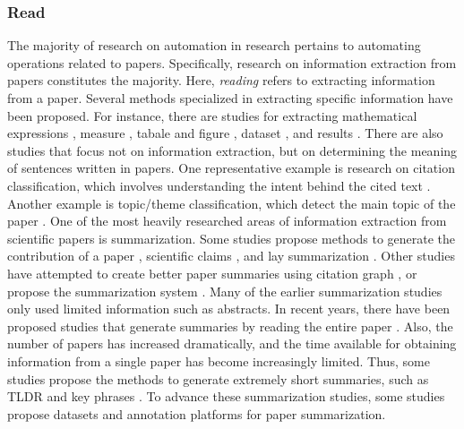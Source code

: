 \documentclass{article}
\begin{document}
\subsubsection{Read}
The majority of research on automation in research pertains to automating operations related to papers. Specifically, research on information extraction from papers constitutes the majority. Here, \textit{reading} refers to extracting information from a paper.
Several methods specialized in extracting specific information have been proposed. For instance, there are studies for extracting mathematical expressions \cite{greiner2020math,madisetty2021neural}, measure \cite{harper2021semeval,kohler2021s}, tabale and figure \cite{shen2022vila,hashmi2021current,zhuang2022resel,yamamoto2021visual}, dataset \cite{hou2019identification,kumar2021dataquest,prasad2019dataset}, and results \cite{kardas2020axcell}.
There are also studies that focus not on information extraction, but on determining the meaning of sentences written in papers. One representative example is research on citation classification, which involves understanding the intent behind the cited text \cite{pride2019act,kunnath2021meta,kunnath2022dynamic,kunnath2022act2,lauscher2021multicite}. Another example is topic/theme classification, which detect the main topic of the paper \cite{sadat2022hierarchical,mendoza2022benchmark,salatino2022cso}.
One of the most heavily researched areas of information extraction from scientific papers is summarization. Some studies propose methods to generate the contribution of a paper \cite{hayashi2020s}, scientific claims \cite{wright2022generating}, and lay summarization \cite{goldsack2022making}. Other studies have attempted to create better paper summaries using citation graph \cite{chen2022scientific,an2021enhancing}, or propose the summarization system \cite{erera2019summarization}.
Many of the earlier summarization studies only used limited information such as abstracts. In recent years, there have been proposed studies that generate summaries by reading the entire paper \cite{subramanian2019extractive,qi2022sapgraph,dong2020discourse,tretyak2020combination}.
Also, the number of papers has increased dramatically, and the time available for obtaining information from a single paper has become increasingly limited. Thus, some studies propose the methods to generate extremely short summaries, such as TLDR \cite{cachola2020tldr} and key phrases \cite{boudin2021keyphrase,garg2021keyphrase}.
To advance these summarization studies, some studies propose datasets \cite{yasunaga2019scisummnet,bastan2022sume} and annotation platforms \cite{el2022platform} for paper summarization. 
\end{document}
